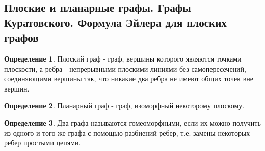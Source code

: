 \documentclass[a4paper]{article}
\theoremstyle{definition}
\newtheorem*{definition}{Определение}
\theoremstyle{remark}
\begin{document}
\begin{multicols*}{2}
    \section{Плоские и планарные графы. Графы Куратовского. Формула Эйлера для плоских графов}
    \begin{definition}
        Плоский граф - граф, вершины которого являются точками плоскости, а ребра - непрерывными плоскими линиями без самопересечений, соединяющими вершины так, что никакие два ребра не имеют общих точек вне вершин.
    \end{definition}
    \begin{definition}
        Планарный граф - граф, изоморфный некоторому плоскому.
    \end{definition}
    \begin{definition}
        Два графа называются гомеоморфными, если их можно получить из одного и того же графа с помощью разбиений ребер, т.е. замены некоторых ребер простыми цепями.
    \end{definition}

\end{multicols*}
\end{document}

